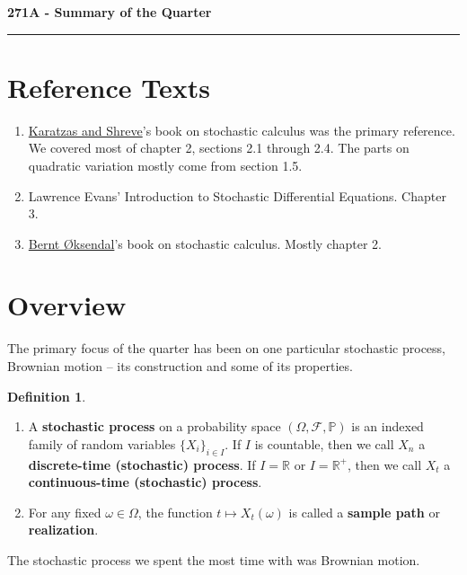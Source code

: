 \documentclass[11pt,letterpaper]{article}
\newcommand{\reals}{\mathbb{R}}
\newcommand{\mcal}[1]{\mathcal{#1}}
\newcommand{\Prob}{\mathbb{P}}
\theoremstyle{plain}
\theoremstyle{definition}
\newtheorem{definition}[theorem]{Definition} %
\begin{document}
\begin{center}
{\bf \Large 271A - Summary of the Quarter}
\vspace{0.2cm}
\hrule
\end{center}

\section{Reference Texts}
\begin{enumerate}
	\item \href{https://link.springer.com/article/10.1007/BF02924331}{Karatzas and Shreve}'s book on stochastic calculus was the primary reference. We covered most of chapter 2, sections 2.1 through 2.4. The parts on quadratic variation mostly come from section 1.5.

	\item Lawrence Evans' Introduction to Stochastic Differential Equations. Chapter 3.

	\item \href{https://link.springer.com/book/10.1007/978-3-642-14394-6}{Bernt \O ksendal}'s book on stochastic calculus. Mostly chapter 2.
\end{enumerate}

\section{Overview}
The primary focus of the quarter has been on one particular stochastic process, Brownian motion -- its construction and some of its properties. 

\begin{definition}
\begin{enumerate}[(a.)]
	\item A \textbf{stochastic process} on a probability space $(\Omega, \mcal{F}, \Prob)$ is an indexed family of random variables $\{X_i\}_{i\in I}$. If $I$ is countable, then we call $X_n$ a \textbf{discrete-time (stochastic) process}. If $I = \reals$ or $I = \reals^+$, then we call $X_t$ a \textbf{continuous-time (stochastic) process}.

	\item For any fixed $\omega\in \Omega$, the function $t\mapsto X_t(\omega)$ is called a \textbf{sample path} or \textbf{realization}. 
\end{enumerate}
\end{definition}

\noindent The stochastic process we spent the most time with was Brownian motion.
\end{document}
